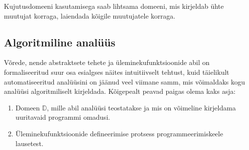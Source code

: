 \documentclass[../thesis.tex]{subfiles}
\begin{document}
Kujutusdomeeni kasutamisega saab lihtsama domeeni, mis kirjeldab ühte muutujat korraga, laiendada kõigile muutujatele korraga.


\subsection{Algoritmiline analüüs}
Võrede, nende abstraktsete tehete ja üleminekufunktsioonide abil on formaliseeritud suur osa esialgses näites intuitiivselt tehtust, kuid täielikult automatiseeritud analüüsini on jäänud veel viimane samm, mis võimaldaks kogu analüüsi algoritmiliselt kirjeldada. Kõigepealt peavad paigas olema kaks asja:
\begin{enumerate}[nosep]
	\item Domeen $\mathbb{D}$, mille abil analüüsi teostatakse ja mis on võimeline kirjeldama uuritavaid programmi omadusi.
	\item Üleminekufunktsioonide defineerimise protsess programmeerimiskeele lausetest.
\end{enumerate}
\end{document}

